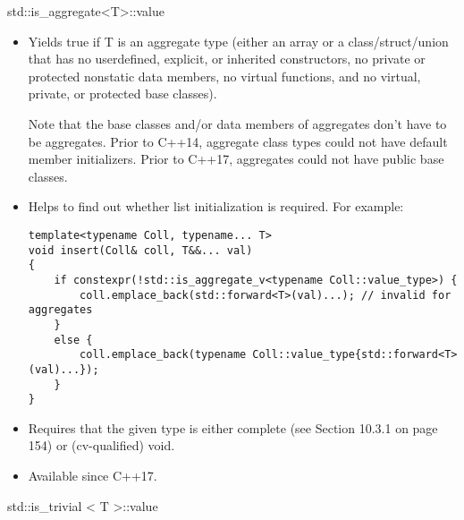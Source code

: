 std::is\_aggregate<T>::value

\begin{itemize}
\item 
Yields true if T is an aggregate type (either an array or a class/struct/union that has no userdefined, explicit, or inherited constructors, no private or protected nonstatic data members, no virtual functions, and no virtual, private, or protected base classes).

\begin{tcolorbox}[colback=webgreen!5!white,colframe=webgreen!75!black]
\hspace*{0.75cm}Note that the base classes and/or data members of aggregates don’t have to be aggregates. Prior to C++14, aggregate class types could not have default member initializers. Prior to C++17, aggregates could not have public base classes.
\end{tcolorbox}

\item 
Helps to find out whether list initialization is required. For example:
\begin{lstlisting}[style=styleCXX]
template<typename Coll, typename... T>
void insert(Coll& coll, T&&... val)
{
	if constexpr(!std::is_aggregate_v<typename Coll::value_type>) {
		coll.emplace_back(std::forward<T>(val)...); // invalid for aggregates
	}
	else {
		coll.emplace_back(typename Coll::value_type{std::forward<T>(val)...});
	}
}
\end{lstlisting}

\item 
Requires that the given type is either complete (see Section 10.3.1 on page 154) or (cv-qualified) void.

\item 
Available since C++17.
\end{itemize}

std::is\_trivial < T >::value

